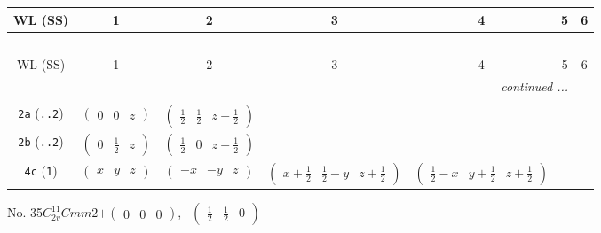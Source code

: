 \documentclass[fleqn,9pt,landscape]{jsarticle}
\begin{document}
\begin{center}
\renewcommand{\arraystretch}{1.2}
\begin{longtable}{ccccccc}
 \hline \hline
WL (SS) & 1 & 2 & 3 & 4 & 5 & 6 \\ \hline \endfirsthead

\multicolumn{6}{l}{\tablename\ \thetable{}} \\
 \hline \hline
WL (SS) & 1 & 2 & 3 & 4 & 5 & 6 \\ \hline \endhead

 \hline \hline
\multicolumn{6}{r}{\footnotesize\it continued ...} \\ \endfoot

 \hline \hline
\multicolumn{6}{r}{} \\ \endlastfoot

{\tt 2a} ({\tt ..2}) & $ \begin{pmatrix} 0 & 0 & z \end{pmatrix} $ & $ \begin{pmatrix} \frac{1}{2} & \frac{1}{2} & z + \frac{1}{2} \end{pmatrix} $ & $  $ & $  $ \\ \hline
{\tt 2b} ({\tt ..2}) & $ \begin{pmatrix} 0 & \frac{1}{2} & z \end{pmatrix} $ & $ \begin{pmatrix} \frac{1}{2} & 0 & z + \frac{1}{2} \end{pmatrix} $ & $  $ & $  $ \\ \hline
{\tt 4c} ({\tt 1}) & $ \begin{pmatrix} x & y & z \end{pmatrix} $ & $ \begin{pmatrix} - x & - y & z \end{pmatrix} $ & $ \begin{pmatrix} x + \frac{1}{2} & \frac{1}{2} - y & z + \frac{1}{2} \end{pmatrix} $ & $ \begin{pmatrix} \frac{1}{2} - x & y + \frac{1}{2} & z + \frac{1}{2} \end{pmatrix} $ \\
\end{longtable}
\end{center}
\newpage
No. 35\quad$C_{2v}^{11}$\quad$Cmm2$\quad[ orthorhombic ]\quad$+\begin{pmatrix} 0 & 0 & 0 \end{pmatrix}$,\quad $+\begin{pmatrix} \frac{1}{2} & \frac{1}{2} & 0 \end{pmatrix}$
\end{document}

